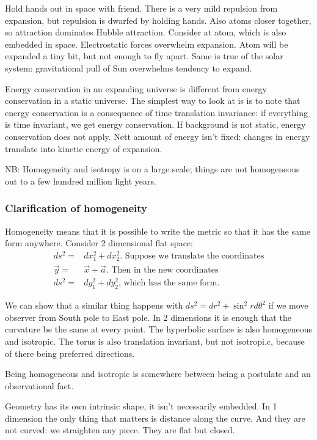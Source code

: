 \documentclass[]{article}
\begin{document}
Hold hands out in space with friend. There is a very mild repulsion from expansion, but repulsion is dwarfed by holding hands. Also atoms closer together, so attraction dominates Hubble attraction. Consider at atom, which is also embedded in space. Electrostatic forces overwhelm expansion. Atom will be expanded a tiny bit, but not enough to fly apart. Same is true of the solar system: gravitational pull of Sun overwhelms tendency to expand.

Energy conservation in an expanding universe is different from energy conservation in a static universe. The simplest way to look at is is to note that energy conservation is a consequence of time translation invariance: if everything is time invariant, we get energy conservation. If background is not static, energy conservation does not apply. Nett amount of energy isn't fixed: changes in energy translate into kinetic energy of expansion.

NB: Homogeneity and isotropy is on a large scale; things are not homogeneous out to a few hundred million light years.

\subsubsection{Clarification of homogeneity}

Homogeneity means that it is possible to write the metric so that it has the same form anywhere. Consider  2 dimensional flat space:
\begin{align*}
	ds^2 =& dx_1^2 + dx_2^2 \text{. Suppose we translate the coordinates}\\
	\vec{y} =& \vec{x} + \vec{a} \text{. Then in the new coordinates}\\
	ds^2 =&dy_1^2 + dy_2^2 \text{, which has the same form.}
\end{align*}

We can show that a similar thing happens with $ds^2=dr^2 + \sin^2 r d\theta^2$ if we move observer from South pole to East pole. In 2 dimensions it is enough that the curvature be the same at every point. The hyperbolic surface is also homogeneous and isotropic. The torus is also translation invariant, but not isotropi.c, because of there being preferred directions.

Being homogeneous and isotropic is somewhere between being a postulate and an observational fact.

Geometry has its own intrinsic shape, it isn't necessarily embedded. In 1 dimension the only thing that matters is distance along the curve. And they are not curved: we straighten any piece. They are flat but closed.
\end{document}
